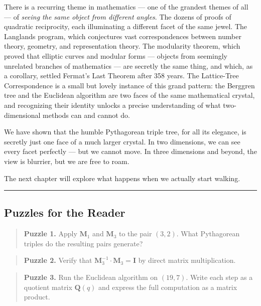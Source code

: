\documentclass[11pt,openany]{book}
\theoremstyle{definition}
\theoremstyle{plain}
\theoremstyle{remark}
\begin{document}
There is a recurring theme in mathematics — one of the grandest themes of all — of \textit{seeing the same object from different angles}. The dozens of proofs of quadratic reciprocity, each illuminating a different facet of the same jewel. The Langlands program, which conjectures vast correspondences between number theory, geometry, and representation theory. The modularity theorem, which proved that elliptic curves and modular forms — objects from seemingly unrelated branches of mathematics — are secretly the same thing, and which, as a corollary, settled Fermat's Last Theorem after 358 years. The Lattice-Tree Correspondence is a small but lovely instance of this grand pattern: the Berggren tree and the Euclidean algorithm are two faces of the same mathematical crystal, and recognizing their identity unlocks a precise understanding of what two-dimensional methods can and cannot do.

We have shown that the humble Pythagorean triple tree, for all its elegance, is secretly just one face of a much larger crystal. In two dimensions, we can see every facet perfectly — but we cannot move. In three dimensions and beyond, the view is blurrier, but we are free to roam.

The next chapter will explore what happens when we actually start walking.

\bigskip\noindent\rule{\textwidth}{0.4pt}\bigskip


\subsection*{Puzzles for the Reader}


\begin{quote}
\textbf{Puzzle 1.} Apply $\mathbf{M}_1$ and $\mathbf{M}_3$ to the pair $(3, 2)$. What Pythagorean triples do the resulting pairs generate?
\end{quote}


\begin{quote}
\textbf{Puzzle 2.} Verify that $\mathbf{M}_3^{-1} \cdot \mathbf{M}_3 = \mathbf{I}$ by direct matrix multiplication.
\end{quote}


\begin{quote}
\textbf{Puzzle 3.} Run the Euclidean algorithm on $(19, 7)$. Write each step as a quotient matrix $\mathbf{Q}(q)$ and express the full computation as a matrix product.
\end{quote}
\end{document}
